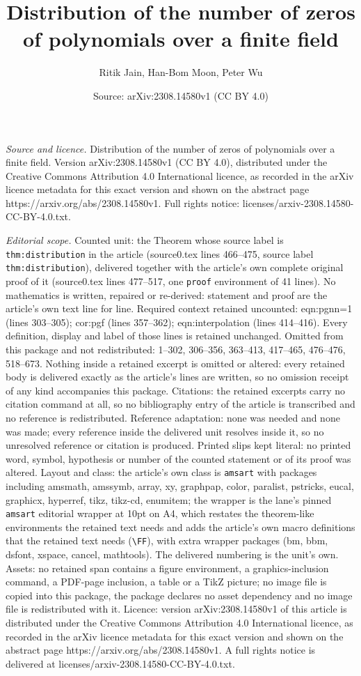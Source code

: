 \documentclass[10pt,a4paper]{amsart}
\title[Distribution of the number of zeros of polynomials over a fi]{Distribution of the number of zeros of polynomials over a finite field}
\author{Ritik Jain, Han-Bom Moon, Peter Wu}
\date{Source: arXiv:2308.14580v1 (CC BY 4.0)}
\begin{document}
\maketitle

\noindent\emph{Source and licence.} Distribution of the number of zeros of polynomials over a finite field. Version arXiv:2308.14580v1 (CC BY 4.0), distributed under the Creative Commons Attribution 4.0 International licence, as recorded in the arXiv licence metadata for this exact version and shown on the abstract page https://arxiv.org/abs/2308.14580v1. Full rights notice: licenses/arxiv-2308.14580-CC-BY-4.0.txt.\par\smallskip

\noindent\textit{Editorial scope.} Counted unit: the Theorem whose source label is \texttt{thm:distribution} in the article (source0.tex lines 466--475, source label \texttt{thm:distribution}), delivered together with the article's own complete original proof of it (source0.tex lines 477--517, one \texttt{proof} environment of 41 lines). No mathematics is written, repaired or re-derived: statement and proof are the article's own text line for line. Required context retained uncounted: eqn:pgnn=1 (lines 303--305); cor:pgf (lines 357--362); eqn:interpolation (lines 414--416). Every definition, display and label of those lines is retained unchanged. Omitted from this package and not redistributed: 1--302, 306--356, 363--413, 417--465, 476--476, 518--673. Nothing inside a retained excerpt is omitted or altered: every retained body is delivered exactly as the article's lines are written, so no omission receipt of any kind accompanies this package. Citations: the retained excerpts carry no citation command at all, so no bibliography entry of the article is transcribed and no reference is redistributed. Reference adaptation: none was needed and none was made; every reference inside the delivered unit resolves inside it, so no unresolved reference or citation is produced. Printed slips kept literal: no printed word, symbol, hypothesis or number of the counted statement or of its proof was altered. Layout and class: the article's own class is \texttt{amsart} with packages including amsmath, amssymb, array, xy, graphpap, color, paralist, pstricks, eucal, graphicx, hyperref, tikz, tikz-cd, enumitem; the wrapper is the lane's pinned \texttt{amsart} editorial wrapper at 10pt on A4, which restates the theorem-like environments the retained text needs and adds the article's own macro definitions that the retained text needs (\texttt{\textbackslash FF}), with extra wrapper packages (bm, bbm, dsfont, xspace, cancel, mathtools). The delivered numbering is the unit's own. Assets: no retained span contains a figure environment, a graphics-inclusion command, a PDF-page inclusion, a table or a TikZ picture; no image file is copied into this package, the package declares no asset dependency and no image file is redistributed with it. Licence: version arXiv:2308.14580v1 of this article is distributed under the Creative Commons Attribution 4.0 International licence, as recorded in the arXiv licence metadata for this exact version and shown on the abstract page https://arxiv.org/abs/2308.14580v1. A full rights notice is delivered at licenses/arxiv-2308.14580-CC-BY-4.0.txt. 
\end{document}
